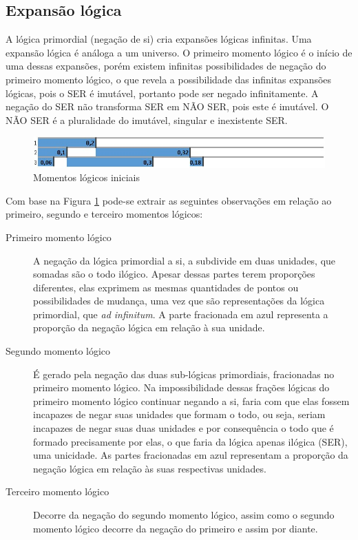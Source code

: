 \subsection{Expansão lógica}
A lógica primordial (negação de si) cria expansões lógicas infinitas. Uma expansão lógica é análoga a um universo. O primeiro momento lógico é o início de uma dessas expansões, porém existem infinitas possibilidades de negação do primeiro momento lógico, o que revela a possibilidade das infinitas expansões lógicas, pois o SER é imutável, portanto pode ser negado infinitamente. A negação do SER não transforma SER em NÃO SER, pois este é imutável. O NÃO SER é a pluralidade do imutável, singular e inexistente SER. 
	\begin{figure}[H]
	\caption{Momentos lógicos iniciais}
	\label{fig:third_logical_moment}
	\centering
	\includegraphics[scale=.85]{sections/images/third_logical_moment.jpg}
	\end{figure}

Com base na Figura \ref{fig:third_logical_moment} pode-se extrair as seguintes observações em relação ao primeiro, segundo e terceiro momentos lógicos:
	\begin{description}
	   \item[Primeiro momento lógico] A negação da lógica primordial a si, a subdivide em duas unidades, que somadas são o todo ilógico. Apesar dessas partes terem proporções diferentes, elas exprimem as mesmas quantidades de pontos ou possibilidades de mudança, uma vez que são representações da lógica primordial, que \textit{ad infinitum}. A parte fracionada em azul representa a proporção da negação lógica em relação à sua unidade.
	   \item[Segundo momento lógico] É gerado pela negação das duas sub-lógicas primordiais, fracionadas no primeiro momento lógico. Na impossibilidade dessas frações lógicas do primeiro momento lógico continuar negando a si, faria com que elas fossem incapazes de negar suas unidades que formam o todo, ou seja, seriam incapazes de negar suas duas unidades e por consequência o todo que é formado precisamente por elas, o que faria da lógica apenas ilógica (SER), uma unicidade. As partes fracionadas em azul representam a proporção da negação lógica em relação às suas respectivas unidades.
	   \item[Terceiro momento lógico] Decorre da negação do segundo momento lógico, assim como o segundo momento lógico decorre da negação do primeiro e assim por diante.
	\end{description}

